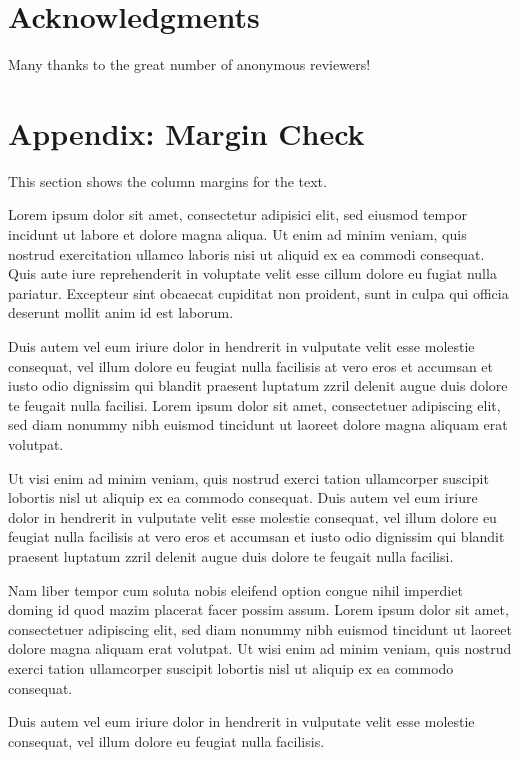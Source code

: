 \documentclass[twoside,a4paper]{article}
\begin{document}
\section{Acknowledgments}
Many thanks to the great number of anonymous reviewers!

\nocite{*}


\section{Appendix: Margin Check}
This section shows the column margins for the text. \bigskip\newline

Lorem ipsum dolor sit amet, consectetur adipisici elit, sed eiusmod tempor incidunt ut labore et dolore magna aliqua. Ut enim ad minim veniam, quis nostrud exercitation ullamco laboris nisi ut aliquid ex ea commodi consequat. Quis aute iure reprehenderit in voluptate velit esse cillum dolore eu fugiat nulla pariatur. Excepteur sint obcaecat cupiditat non proident, sunt in culpa qui officia deserunt mollit anim id est laborum.


Duis autem vel eum iriure dolor in hendrerit in vulputate velit esse molestie consequat, vel illum dolore eu feugiat nulla facilisis at vero eros et accumsan et iusto odio dignissim qui blandit praesent luptatum zzril delenit augue duis dolore te feugait nulla facilisi. Lorem ipsum dolor sit amet, consectetuer adipiscing elit, sed diam nonummy nibh euismod tincidunt ut laoreet dolore magna aliquam erat volutpat.

Ut visi enim ad minim veniam, quis nostrud exerci tation ullamcorper suscipit lobortis nisl ut aliquip ex ea commodo consequat. Duis autem vel eum iriure dolor in hendrerit in vulputate velit esse molestie consequat, vel illum dolore eu feugiat nulla facilisis at vero eros et accumsan et iusto odio dignissim qui blandit praesent luptatum zzril delenit augue duis dolore te feugait nulla facilisi.

Nam liber tempor cum soluta nobis eleifend option congue nihil imperdiet doming id quod mazim placerat facer possim assum. Lorem ipsum dolor sit amet, consectetuer adipiscing elit, sed diam nonummy nibh euismod tincidunt ut laoreet dolore magna aliquam erat volutpat. Ut wisi enim ad minim veniam, quis nostrud exerci tation ullamcorper suscipit lobortis nisl ut aliquip ex ea commodo consequat.

Duis autem vel eum iriure dolor in hendrerit in vulputate velit esse molestie consequat, vel illum dolore eu feugiat nulla facilisis.
\end{document}

